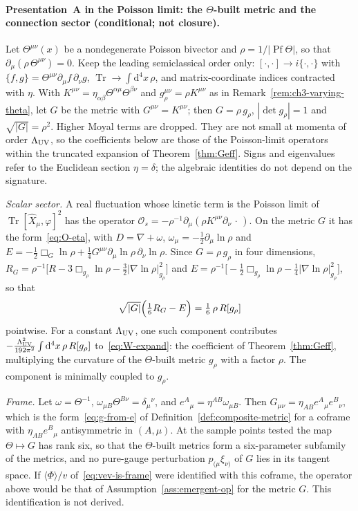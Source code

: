 \paragraph{Presentation~A in the Poisson limit: the \(\Theta\)-built metric and the connection sector (conditional; not closure).}
Let \(\Theta^{\mu\nu}(x)\) be a nondegenerate Poisson bivector and
\(\rho=1/|\operatorname{Pf}\Theta|\), so that
\(\partial_\mu(\rho\,\Theta^{\mu\nu})=0\). Keep the leading
semiclassical order only:
\([\cdot,\cdot]\to i\{\cdot,\cdot\}\) with
\(\{f,g\}=\Theta^{\mu\nu}\partial_\mu f\,\partial_\nu g\),
\(\operatorname{Tr}\to\int\mathrm{d}^4x\,\rho\), and matrix-coordinate
indices contracted with \(\eta\). With
\(K^{\mu\nu}=\eta_{\alpha\beta}\Theta^{\alpha\mu}\Theta^{\beta\nu}\) and
\(g_\rho^{\mu\nu}=\rho K^{\mu\nu}\) as in
Remark~\ref{rem:ch3-varying-theta}, let \(G\) be the metric with
\(G^{\mu\nu}=K^{\mu\nu}\); then \(G=\rho\,g_\rho\),
\(|\det g_\rho|=1\) and \(\sqrt{|G|}=\rho^2\). Higher Moyal terms are
dropped. They are not small at momenta of order \(\Lambda_{\mathrm{UV}}\), so the
coefficients below are those of the Poisson-limit operators within the
truncated expansion of Theorem~\ref{thm:Geff}. Signs and eigenvalues
refer to the Euclidean section \(\eta=\delta\); the algebraic identities
do not depend on the signature.

\emph{Scalar sector.} A real fluctuation whose kinetic term is the
Poisson limit of \(\operatorname{Tr}[\hat X_\mu,\varphi]^2\) has the
operator
\(\mathcal O_s=-\rho^{-1}\partial_\mu(\rho K^{\mu\nu}\partial_\nu\,\cdot\,)\).
On the metric \(G\) it has the form~\eqref{eq:O-eta}, with
\(D=\nabla+\omega\), \(\omega_\mu=-\tfrac12\partial_\mu\ln\rho\) and
\(E=-\tfrac12\Box_G\ln\rho
+\tfrac14G^{\mu\nu}\partial_\mu\ln\rho\,\partial_\nu\ln\rho\).
Since \(G=\rho\,g_\rho\) in four dimensions,
\(R_G=\rho^{-1}\bigl[R-3\Box_{g_\rho}\ln\rho
-\tfrac32|\nabla\ln\rho|^2_{g_\rho}\bigr]\) and
\(E=\rho^{-1}\bigl[-\tfrac12\Box_{g_\rho}\ln\rho
-\tfrac14|\nabla\ln\rho|^2_{g_\rho}\bigr]\), so that
\[
  \sqrt{|G|}\Bigl(\tfrac16R_G-E\Bigr)=\tfrac16\,\rho\,R[g_\rho]
\]
pointwise. For a constant \(\Lambda_{\mathrm{UV}}\), one such component contributes
\(-\tfrac{\Lambda_{\mathrm{UV}}^2}{192\pi^2}\int\mathrm{d}^4x\,\rho\,R[g_\rho]\)
to~\eqref{eq:W-expand}: the coefficient of
Theorem~\ref{thm:Geff}, multiplying the curvature of the
\(\Theta\)-built metric \(g_\rho\) with a factor \(\rho\). The
component is minimally coupled to \(g_\rho\).

\emph{Frame.} Let \(\omega=\Theta^{-1}\), \(\omega_{\mu B}\Theta^{B\nu}
=\delta_\mu{}^\nu\), and \(e^A{}_\mu=\eta^{AB}\omega_{\mu B}\). Then
\(G_{\mu\nu}=\eta_{AB}e^A{}_\mu e^B{}_\nu\), which is the
form~\eqref{eq:g-from-e} of Definition~\ref{def:composite-metric} for
a coframe with \(\eta_{AB}e^B{}_\mu\) antisymmetric in \((A,\mu)\).
At the sample points tested the map \(\Theta\mapsto G\) has rank six,
so that the \(\Theta\)-built metrics form a six-parameter subfamily of
the metrics, and no pure-gauge perturbation
\(p_{(\mu}\xi_{\nu)}\) of \(G\) lies in its tangent space. If
\(\langle\Phi\rangle/v\) of~\eqref{eq:vev-is-frame} were identified with
this coframe, the operator above would be that of
Assumption~\ref{ass:emergent-op} for the metric \(G\). This
identification is not derived.

